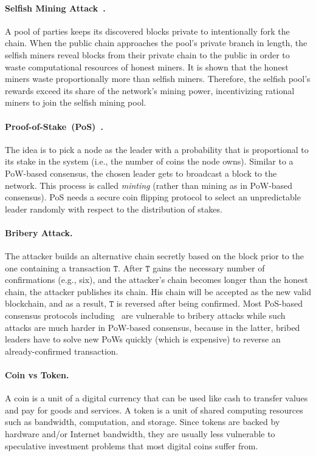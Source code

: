 \documentclass[11pt]{article}
\theoremstyle{mytheoremstyle}
\begin{document}
\paragraph{Selfish Mining Attack~\cite{eyal2014}.} A pool of parties keeps its discovered blocks private to intentionally fork the chain. When the public chain approaches the pool's private branch in length, the selfish miners reveal blocks from their private chain to the public in order to waste computational resources of honest miners. It is shown that the honest miners waste proportionally more than selfish miners. Therefore, the selfish pool's rewards exceed its share of the network's mining power, incentivizing rational miners to join the selfish mining pool.

\paragraph{Proof-of-Stake~(PoS)~\cite{Ouroboros:crypto:2017}.} The idea is to pick a node as the leader with a probability that is proportional to its stake in the system (i.e., the number of coins the node owns). Similar to a PoW-based consensus, the chosen leader gets to broadcast a block to the network. This process is called \emph{minting} (rather than mining as in PoW-based consensus). PoS needs a secure coin flipping protocol to select an unpredictable leader randomly with respect to the distribution of stakes.

\paragraph{Bribery Attack.} The attacker builds an alternative chain secretly based on the block prior to the one containing a transaction $\mathtt{T}$. After $\mathtt{T}$ gains the necessary number of confirmations (e.g., six), and the attacker's chain becomes longer than the honest chain, the attacker publishes its chain. His chain will be accepted as the new valid blockchain, and as a result, $\mathtt{T}$ is reversed after being confirmed. Most PoS-based consensus protocols including~\cite{Ouroboros:crypto:2017,algorand16} are vulnerable to bribery attacks while such attacks are much harder in PoW-based consensus, because in the latter, bribed leaders have to solve new PoWs quickly (which is expensive) to reverse an already-confirmed transaction.

\paragraph{Coin vs Token.} A coin is a unit of a digital currency that can be used like cash to transfer values and pay for goods and services. A token is a unit of shared computing resources such as bandwidth, computation, and storage. Since tokens are backed by hardware and/or Internet bandwidth, they are usually less vulnerable to speculative investment problems that most digital coins suffer from.
\end{document}
